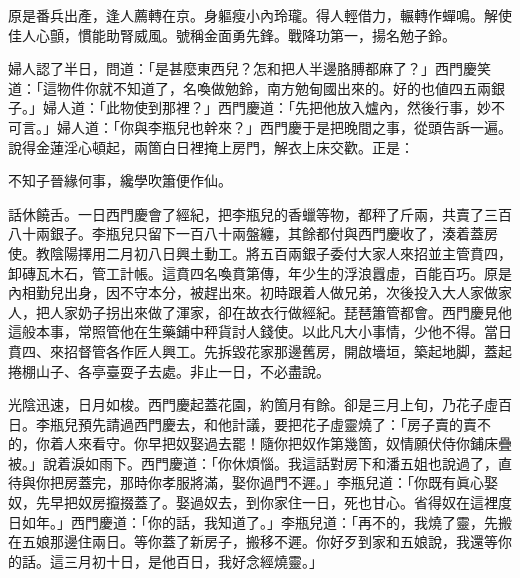 \begin{myquote}
原是番兵出產，逢人薦轉在京。身軀瘦小內玲瓏。得人輕借力，輾轉作蟬鳴。解使佳人心顫，慣能助腎威風。號稱金面勇先鋒。戰降功第一，揚名勉子鈴。
\end{myquote}

婦人認了半日，問道：「是甚麼東西兒？怎和把人半邊胳膊都麻了？」{}西門慶笑道：「這物件你就不知道了，名喚做勉鈴，南方勉甸國出來的。好的也値四五兩銀子。」婦人道：「此物使到那裡？」西門慶道：「先把他放入爐內，然後行事，妙不可言。」婦人道：「你與李瓶兒也幹來？」{}西門慶于是把晚間之事，從頭告訴一遍。說得金蓮淫心頓起，兩箇白日裡掩上房門，解衣上床交歡。正是：

\begin{myquote}
不知子晉緣何事，纔學吹簫便作仙。
\end{myquote}

話休饒舌。一日西門慶會了經紀，把李瓶兒的香蠟等物，都秤了斤兩，共賣了三百八十兩銀子。李瓶兒只留下一百八十兩盤纏，其餘都付與西門慶收了，湊着蓋房使。教陰陽擇用二月初八日興土動工。將五百兩銀子委付大家人來招並主管賁四，卸磚瓦木石，管工計帳。這賁四名喚賁第傳，年少生的浮浪囂虛，百能百巧。原是內相勤兒出身，因不守本分，被趕出來。初時跟着人做兄弟，次後投入大人家做家人，把人家奶子拐出來做了渾家，{}卻在故衣行做經紀。琵琶簫管都會。西門慶見他這般本事，常照管他在生藥鋪中秤貨討人錢使。以此凡大小事情，少他不得。當日賁四、來招督管各作匠人興工。先拆毀花家那邊舊房，開啟墻垣，築起地脚，蓋起捲棚山子、各亭臺耍子去處。非止一日，不必盡說。

光陰迅速，日月如梭。西門慶起蓋花園，約箇月有餘。卻是三月上旬，乃花子虛百日。李瓶兒預先請過西門慶去，和他計議，要把花子虛靈燒了：「房子賣的賣不的，你着人來看守。你早把奴娶過去罷！隨你把奴作第幾箇，奴情願伏侍你鋪床疊被。」說着淚如雨下。{}西門慶道：「你休煩惱。我這話對房下和潘五姐也說過了，直待與你把房蓋完，那時你孝服將滿，娶你過門不遲。」李瓶兒道：「你既有眞心娶奴，先早把奴房攛掇蓋了。娶過奴去，到你家住一日，死也甘心。{}省得奴在這裡度日如年。」西門慶道：「你的話，我知道了。」李瓶兒道：「再不的，我燒了靈，先搬在五娘那邊住兩日。{}等你蓋了新房子，搬移不遲。你好歹到家和五娘說，我還等你的話。這三月初十日，是他百日，我好念經燒靈。」

